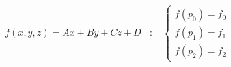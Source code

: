 \documentclass{article}
\begin{document}
\thispagestyle{empty}

$$
f(x,y,z) = Ax + By + Cz + D~~~~:~~~~
\left\{
\begin{array}{lcr}
f(p_0) = f_0\\
f(p_1) = f_1\\
f(p_2) = f_2
\end{array}
\right.
$$
\end{document}

